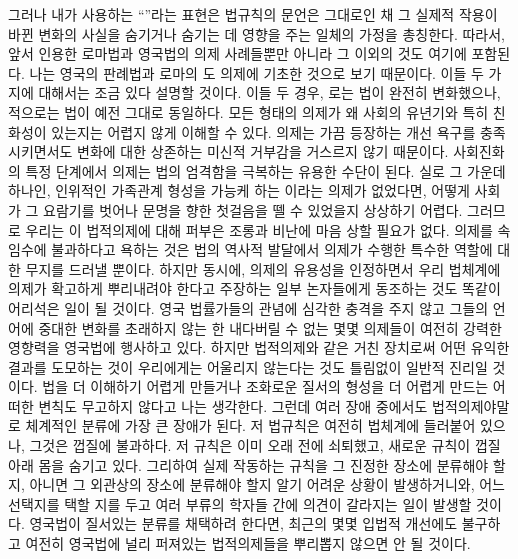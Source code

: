 그러나 내가 사용하는 ``''라는 표현은
법규칙의 문언은 그대로인 채 그 실제적 작용이 바뀐 변화의 사실을
숨기거나 숨기는 데 영향을 주는 일체의 가정을 총칭한다.
따라서, 앞서 인용한 로마법과 영국법의 의제 사례들뿐만 아니라
그 이외의 것도 여기에 포함된다. 나는 영국의 판례법과 로마의
도 의제에 기초한 것으로 보기 때문이다.
이들 두 가지에 대해서는 조금 있다 설명할 것이다.
이들 두 경우, 로는 법이 완전히 변화했으나,
적으로는 법이 예전 그대로 동일하다.
모든 형태의 의제가 왜 사회의 유년기와 특히 친화성이 있는지는 어렵지 않게
이해할 수 있다.
의제는 가끔 등장하는 개선 욕구를 충족시키면서도
변화에 대한 상존하는 미신적 거부감을 거스르지 않기 때문이다.
사회진화의 특정 단계에서 의제는 법의 엄격함을 극복하는 유용한 수단이 된다.
실로 그 가운데 하나인, 인위적인 가족관계 형성을 가능케 하는
이라는 의제가 없었다면, 어떻게 사회가 그 요람기를 벗어나
문명을 향한 첫걸음을 뗄 수 있었을지 상상하기 어렵다.
그러므로 우리는 이 법적의제에 대해 퍼부은 조롱과 비난에 마음 상할
필요가 없다.
의제를 속임수에 불과하다고 욕하는 것은 법의 역사적 발달에서
의제가 수행한 특수한 역할에 대한 무지를 드러낼 뿐이다.
하지만 동시에, 의제의 유용성을 인정하면서 우리 법체계에 의제가
확고하게 뿌리내려야 한다고 주장하는 일부 논자들에게 동조하는 것도 똑같이
어리석은 일이 될 것이다.
영국 법률가들의 관념에 심각한 충격을 주지 않고
그들의 언어에 중대한 변화를 초래하지 않는 한
내다버릴 수 없는 몇몇 의제들이 여전히 강력한 영향력을 영국법에 행사하고 있다.
하지만 법적의제와 같은 거친 장치로써 어떤 유익한 결과를 도모하는 것이
우리에게는 어울리지 않는다는 것도 틀림없이 일반적 진리일 것이다.
법을 더 이해하기 어렵게 만들거나 조화로운 질서의 형성을 더 어렵게 만드는
어떠한 변칙도 무고하지 않다고 나는 생각한다.
그런데 여러 장애 중에서도 법적의제야말로 체계적인 분류에 가장 큰
장애가 된다.
저 법규칙은 여전히 법체계에 들러붙어 있으나,
그것은 껍질에 불과하다.
저 규칙은 이미 오래 전에 쇠퇴했고, 새로운 규칙이 껍질 아래 몸을 숨기고 있다.
그리하여 실제 작동하는 규칙을 그 진정한 장소에 분류해야 할지,
아니면 그 외관상의 장소에 분류해야 할지 알기 어려운 상황이 발생하거니와,
어느 선택지를 택할 지를 두고 여러 부류의 학자들 간에 의견이
갈라지는 일이 발생할 것이다.
영국법이 질서있는 분류를 채택하려 한다면,
최근의 몇몇 입법적 개선에도 불구하고 여전히 영국법에 널리 퍼져있는
법적의제들을 뿌리뽑지 않으면 안 될 것이다.


